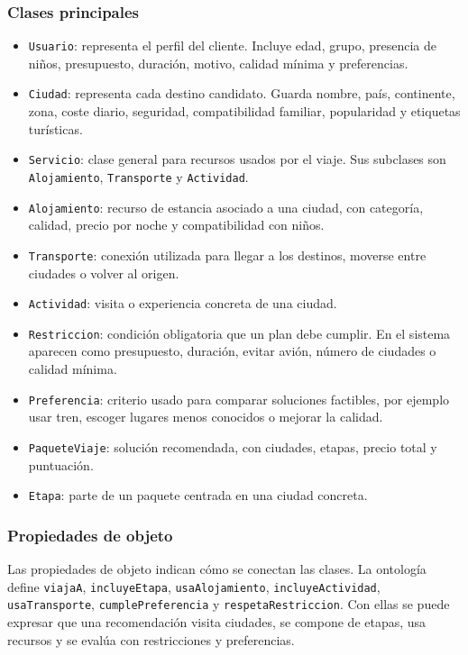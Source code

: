 \documentclass[11pt,a4paper]{article}
\begin{document}
\subsubsection{Clases principales}
\begin{itemize}
    \item \texttt{Usuario}: representa el perfil del cliente. Incluye edad,
    grupo, presencia de ni\~nos, presupuesto, duraci\'on, motivo, calidad m\'inima
    y preferencias.
    \item \texttt{Ciudad}: representa cada destino candidato. Guarda nombre,
    pa\'is, continente, zona, coste diario, seguridad, compatibilidad familiar,
    popularidad y etiquetas tur\'isticas.
    \item \texttt{Servicio}: clase general para recursos usados por el viaje.
    Sus subclases son \texttt{Alojamiento}, \texttt{Transporte} y
    \texttt{Actividad}.
    \item \texttt{Alojamiento}: recurso de estancia asociado a una ciudad, con
    categor\'ia, calidad, precio por noche y compatibilidad con ni\~nos.
    \item \texttt{Transporte}: conexi\'on utilizada para llegar a los destinos,
    moverse entre ciudades o volver al origen.
    \item \texttt{Actividad}: visita o experiencia concreta de una ciudad.
    \item \texttt{Restriccion}: condici\'on obligatoria que un plan debe cumplir.
    En el sistema aparecen como presupuesto, duraci\'on, evitar avi\'on, n\'umero
    de ciudades o calidad m\'inima.
    \item \texttt{Preferencia}: criterio usado para comparar soluciones
    factibles, por ejemplo usar tren, escoger lugares menos conocidos o mejorar
    la calidad.
    \item \texttt{PaqueteViaje}: soluci\'on recomendada, con ciudades, etapas,
    precio total y puntuaci\'on.
    \item \texttt{Etapa}: parte de un paquete centrada en una ciudad concreta.
\end{itemize}

\subsubsection{Propiedades de objeto}
Las propiedades de objeto indican c\'omo se conectan las clases. La ontolog\'ia
define \texttt{viajaA}, \texttt{incluyeEtapa}, \texttt{usaAlojamiento},
\texttt{incluyeActividad}, \texttt{usaTransporte}, \texttt{cumplePreferencia}
y \texttt{respetaRestriccion}. Con ellas se puede expresar que una
recomendaci\'on visita ciudades, se compone de etapas, usa recursos y se eval\'ua
con restricciones y preferencias.
\end{document}
